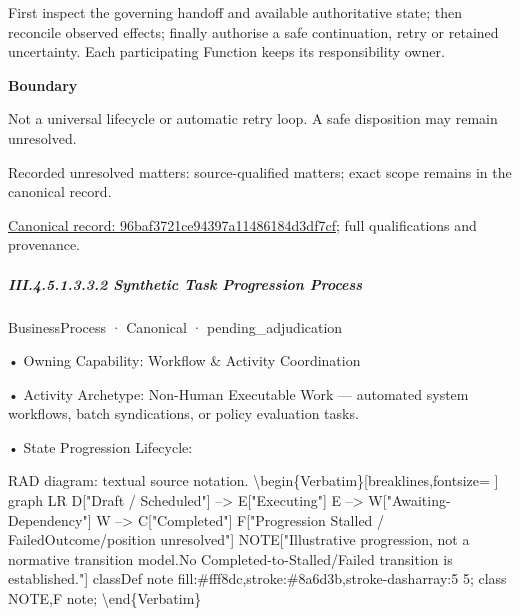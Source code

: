 First inspect the governing handoff and available authoritative state; then reconcile observed effects; finally authorise a safe continuation, retry or retained uncertainty. Each participating Function keeps its responsibility owner.



\textbf{Boundary}



Not a universal lifecycle or automatic retry loop. A safe disposition may remain unresolved.


{\small Recorded unresolved matters: source-qualified matters; exact scope remains in the canonical record.}\par
{\footnotesize \href{../../../../continuum/business/business-process/96baf3721ce94397a11486184d3df7cf.md}{Canonical record: 96baf3721ce94397a11486184d3df7cf}; full qualifications and provenance.}\par
\subparagraph*{III.4.5.1.3.3.2 Synthetic Task Progression Process}
\label{navigation:III.4.5.1.3.3.2}

\label{element:618acdb38fc74952ab360fdde4f7d865}
{\small BusinessProcess · Canonical · pending\_adjudication}\par

•
Owning Capability: Workflow \& Activity Coordination



•
Activity Archetype: Non-Human Executable Work — automated system workflows, batch syndications, or policy evaluation tasks.



•
State Progression Lifecycle:



RAD diagram: textual source notation.
\textbackslash{}begin\{Verbatim\}[breaklines,fontsize=
]
graph LR
    D["Draft / Scheduled"] --> E["Executing"]
    E --> W["Awaiting-Dependency"]
    W --> C["Completed"]
    F["Progression Stalled / Failed\newline{}Outcome/position unresolved"]
    NOTE["Illustrative progression, not a normative transition model.\newline{}No Completed-to-Stalled/Failed transition is established."]
    classDef note fill:\#fff8dc,stroke:\#8a6d3b,stroke-dasharray:5 5;
    class NOTE,F note;
\textbackslash{}end\{Verbatim\}



